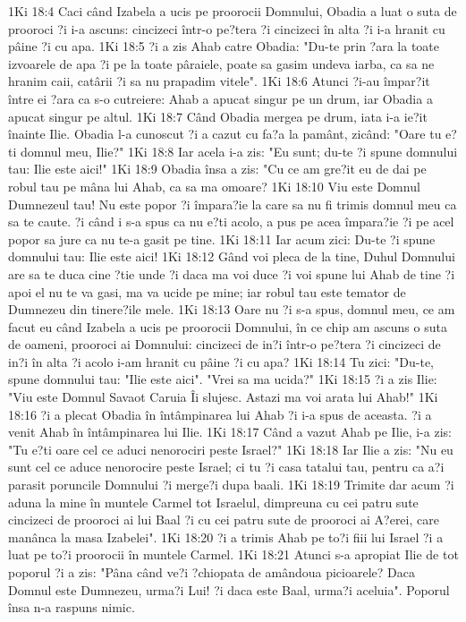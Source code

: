 1Ki 18:4  Caci când Izabela a ucis pe proorocii Domnului, Obadia a luat o suta de prooroci ?i i-a ascuns: cincizeci într-o pe?tera ?i cincizeci în alta ?i i-a hranit cu pâine ?i cu apa.
1Ki 18:5  ?i a zis Ahab catre Obadia: "Du-te prin ?ara la toate izvoarele de apa ?i pe la toate pâraiele, poate sa gasim undeva iarba, ca sa ne hranim caii, catârii ?i sa nu prapadim vitele".
1Ki 18:6  Atunci ?i-au împar?it între ei ?ara ca s-o cutreiere: Ahab a apucat singur pe un drum, iar Obadia a apucat singur pe altul.
1Ki 18:7  Când Obadia mergea pe drum, iata i-a ie?it înainte Ilie. Obadia l-a cunoscut ?i a cazut cu fa?a la pamânt, zicând: "Oare tu e?ti domnul meu, Ilie?"
1Ki 18:8  Iar acela i-a zis: "Eu sunt; du-te ?i spune domnului tau: Ilie este aici!"
1Ki 18:9  Obadia însa a zis: "Cu ce am gre?it eu de dai pe robul tau pe mâna lui Ahab, ca sa ma omoare?
1Ki 18:10  Viu este Domnul Dumnezeul tau! Nu este popor ?i împara?ie la care sa nu fi trimis domnul meu ca sa te caute. ?i când i s-a spus ca nu e?ti acolo, a pus pe acea împara?ie ?i pe acel popor sa jure ca nu te-a gasit pe tine.
1Ki 18:11  Iar acum zici: Du-te ?i spune domnului tau: Ilie este aici!
1Ki 18:12  Gând voi pleca de la tine, Duhul Domnului are sa te duca cine ?tie unde ?i daca ma voi duce ?i voi spune lui Ahab de tine ?i apoi el nu te va gasi, ma va ucide pe mine; iar robul tau este temator de Dumnezeu din tinere?ile mele.
1Ki 18:13  Oare nu ?i s-a spus, domnul meu, ce am facut eu când Izabela a ucis pe proorocii Domnului, în ce chip am ascuns o suta de oameni, prooroci ai Domnului: cincizeci de in?i într-o pe?tera ?i cincizeci de in?i în alta ?i acolo i-am hranit cu pâine ?i cu apa?
1Ki 18:14  Tu zici: "Du-te, spune domnului tau: "Ilie este aici". "Vrei sa ma ucida?"
1Ki 18:15  ?i a zis Ilie: "Viu este Domnul Savaot Caruia Îi slujesc. Astazi ma voi arata lui Ahab!"
1Ki 18:16  ?i a plecat Obadia în întâmpinarea lui Ahab ?i i-a spus de aceasta. ?i a venit Ahab în întâmpinarea lui Ilie.
1Ki 18:17  Când a vazut Ahab pe Ilie, i-a zis: "Tu e?ti oare cel ce aduci nenorociri peste Israel?"
1Ki 18:18  Iar Ilie a zis: "Nu eu sunt cel ce aduce nenorocire peste Israel; ci tu ?i casa tatalui tau, pentru ca a?i parasit poruncile Domnului ?i merge?i dupa baali.
1Ki 18:19  Trimite dar acum ?i aduna la mine în muntele Carmel tot Israelul, dimpreuna cu cei patru sute cincizeci de prooroci ai lui Baal ?i cu cei patru sute de prooroci ai A?erei, care manânca la masa Izabelei".
1Ki 18:20  ?i a trimis Ahab pe to?i fiii lui Israel ?i a luat pe to?i proorocii în muntele Carmel.
1Ki 18:21  Atunci s-a apropiat Ilie de tot poporul ?i a zis: "Pâna când ve?i ?chiopata de amândoua picioarele? Daca Domnul este Dumnezeu, urma?i Lui! ?i daca este Baal, urma?i aceluia". Poporul însa n-a raspuns nimic.
